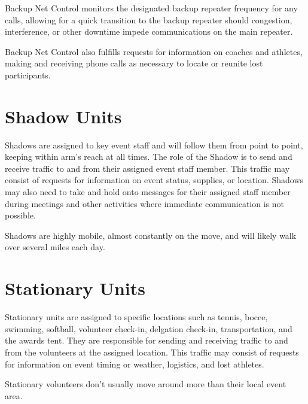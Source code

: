 \documentclass[pdflatex,letterpaper,twoside,12pt]{book}
\begin{document}
Backup Net Control monitors the designated backup repeater frequency for any calls, allowing for a quick transition to the backup repeater should congestion, interference, or other downtime impede communications on the main repeater.

Backup Net Control also fulfills requests for information on coaches and athletes, making and receiving phone calls as necessary to locate or reunite lost participants.


\section{Shadow Units}

Shadows are assigned to key event staff and will follow them from point to point, keeping within arm's reach at all times.  The role of the Shadow is to send and receive traffic to and from their assigned event staff member.  This traffic may consist of requests for information on event status, supplies, or location.  Shadows may also need to take and hold onto messages for their assigned staff member during meetings and other activities where immediate communication is not possible.

Shadows are highly mobile, almost constantly on the move, and will likely walk over several miles each day.


\section{Stationary Units}

Stationary units are assigned to specific locations such as tennis, bocce, swimming, softball, volunteer check-in, delgation check-in, transportation, and the awards tent.  They are responsible for sending and receiving traffic to and from the volunteers at the assigned location.  This traffic may consist of requests for information on event timing or weather, logistics, and lost athletes.

Stationary volunteers don't usually move around more than their local event area.

\end{document}
